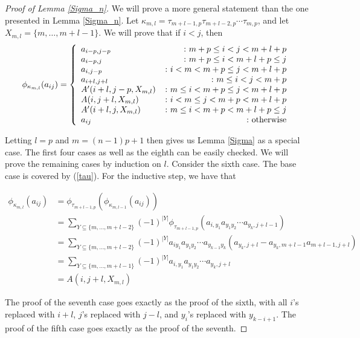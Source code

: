 \documentclass[11pt]{amsart}
\def\ltblue{blue!20!white}
\def\t{{\tau}}
\def\k{{\kappa}}
\theoremstyle{definition}
\begin{document}
\begin{proof} [Proof of Lemma \ref{Sigma_n}]\todo[color=\ltblue,inline]{check}

We will prove a more general statement than the one presented in Lemma \ref{Sigma_n}.  Let $\kappa_{m,l} = \t_{m+l-1,p}\t_{m+l-2,p}\cdots\t_{m,p}$, and let $X_{m,l} = \{m,\ldots,m+l-1\}$.  We will prove that if $i<j$, then
\todo[color=\ltblue]{check}
$$
\phi_{\kappa_{m,l}}(a_{ij}) =
\left\{
     \begin{array}{lr}
       a_{i-p,j-p} & \colon m+p\le i<j< m+l+p\\
       a_{i-p,j} &\colon m+p\le i< m+l+p\le j\\
       a_{i,j-p} & \colon i<m<m+p\le j<m+l+p\\
       a_{i+l,j+l} &\colon m\le i<j<m+p\\
       A'(i+l,j-p,X_{m,l}) & \colon m\le i<m+p\le j <m+l+p\\
       A(i,j+l,X_{m,l}) & \colon i<m\le j <m+p<m+l+p\\
       A'(i+l,j,X_{m,l}) & \colon m\le i <m+p<m+l+p\le j\\
       a_{ij} & \colon \textnormal{otherwise}
     \end{array}
\right.
$$


Letting $l=p$ and $m=(n-1)p+1$ then gives us Lemma \ref{Sigma} as a special case.  The first four cases  as well as the eighth can be easily checked.  We will prove the remaining cases by induction on $l$.  Consider the sixth case.  The base case is covered by (\ref{tau}).  For the inductive step, we have that

\begin{align*}
\phi_{\k_{m,l}}(a_{ij}) &= \phi_{\t_{m+l-1,p}}\left(\phi_{\k_{m,l-1}}(a_{ij})\right)\\
&= \sum_{Y\subseteq \{m,\ldots,m+l-2\}} (-1)^{|Y|} \phi_{\t_{m+l-1,p}}\left(a_{i,y_1}a_{y_1y_2}\cdots a_{y_k,j+l-1}\right)\\
&= \sum_{Y\subseteq \{m,\ldots,m+l-2\}} (-1)^{|Y|} a_{iy_1}a_{y_1y_2}\cdots a_{y_{k-1}y_k}\left(a_{y_k,j+l}-a_{y_k,m+l-1}a_{m+l-1,j+l}\right)\\
&= \sum_{Y\subseteq \{m,\ldots,m+l-1\}} (-1)^{|Y|} a_{i,y_1}a_{y_1y_2}\cdots a_{y_k,j+l}\\
&= A(i,j+l,X_{m,l})
\end{align*}

The proof of the seventh case goes exactly as the proof of the sixth, with all $i$'s replaced with $i+l$, $j$'s replaced with $j-l$, and $y_i$'s replaced with $y_{k-i+1}$.  The proof of the fifth case goes exactly as the proof of the seventh.
\end{proof}
\end{document}
